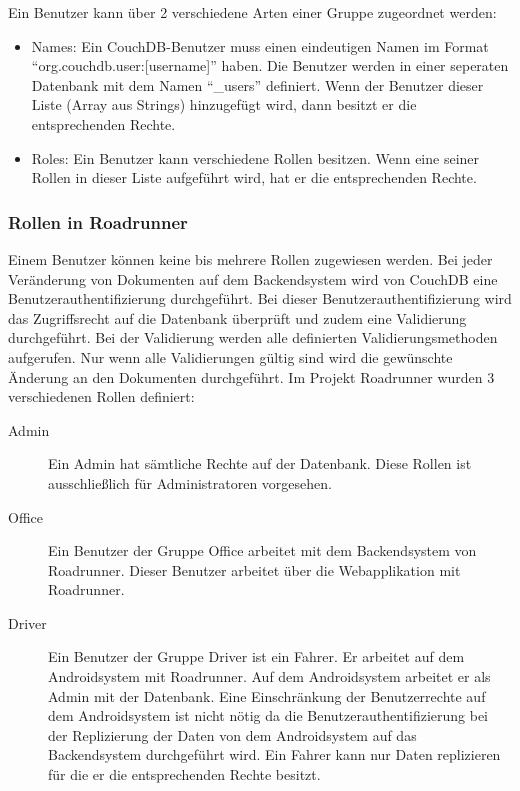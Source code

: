 \noindent Ein Benutzer kann über 2 verschiedene Arten einer Gruppe zugeordnet werden:
 \begin{itemize}
\item Names: Ein CouchDB-Benutzer muss einen eindeutigen Namen im Format "`org.couchdb.user:[username]"' haben. Die Benutzer werden in einer seperaten Datenbank mit dem Namen "`\_users"' definiert. Wenn der Benutzer dieser Liste (Array aus Strings) hinzugefügt wird, dann besitzt er die entsprechenden Rechte.
\item Roles: Ein Benutzer kann verschiedene Rollen besitzen. Wenn eine seiner Rollen in dieser Liste aufgeführt wird, hat er die entsprechenden Rechte. 
\end{itemize}

\subsubsection{Rollen in Roadrunner}

Einem Benutzer können keine bis mehrere Rollen zugewiesen werden. Bei jeder Veränderung von Dokumenten auf dem Backendsystem wird von CouchDB eine Benutzerauthentifizierung durchgeführt. Bei dieser Benutzerauthentifizierung wird das Zugriffsrecht auf die Datenbank überprüft und zudem eine Validierung durchgeführt. Bei der Validierung werden alle definierten Validierungsmethoden aufgerufen. Nur wenn alle Validierungen gültig sind wird die gewünschte Änderung an den Dokumenten durchgeführt.
\newline \newline \noindent
Im Projekt Roadrunner wurden 3 verschiedenen Rollen definiert:
\begin{description}
\item[Admin] Ein Admin hat sämtliche Rechte auf der Datenbank. Diese Rollen ist ausschließlich für Administratoren vorgesehen.
\item[Office] Ein Benutzer der Gruppe Office arbeitet mit dem Backendsystem von Roadrunner. Dieser Benutzer arbeitet über die Webapplikation mit Roadrunner.
\item[Driver] Ein Benutzer der Gruppe Driver ist ein Fahrer. Er arbeitet auf dem Androidsystem mit Roadrunner. Auf dem Androidsystem arbeitet er als Admin mit der Datenbank. Eine Einschränkung der Benutzerrechte auf dem Androidsystem ist nicht nötig da die Benutzerauthentifizierung bei der Replizierung der Daten von dem Androidsystem auf das Backendsystem durchgeführt wird. Ein Fahrer kann nur Daten replizieren für die er die entsprechenden Rechte besitzt.
\end{description}

